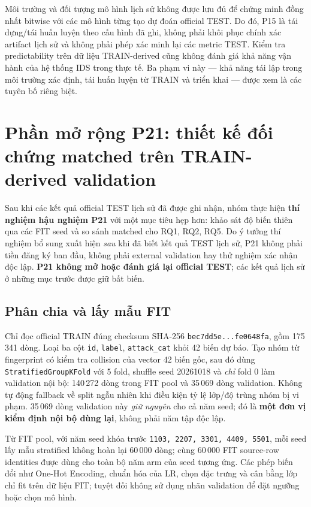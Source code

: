 Môi trường và đối tượng mô hình lịch sử không được lưu đủ để chứng minh đồng nhất bitwise với các mô hình từng tạo dự đoán official TEST. Do đó, P15 là tái dựng/tái huấn luyện theo cấu hình đã ghi, không phải khôi phục chính xác artifact lịch sử và không phải phép xác minh lại các metric TEST. Kiểm tra predictability trên dữ liệu TRAIN-derived cũng không đánh giá khả năng vận hành của hệ thống IDS trong thực tế. Ba phạm vi này — khả năng tái lập trong môi trường xác định, tái huấn luyện từ TRAIN và triển khai — được xem là các tuyên bố riêng biệt.


\section{Phần mở rộng P21: thiết kế đối chứng matched trên TRAIN-derived validation}
\label{sec:p21-method}
Sau khi các kết quả official TEST lịch sử đã được ghi nhận, nhóm thực hiện \textbf{thí nghiệm hậu nghiệm P21} với một mục tiêu hẹp hơn: khảo sát độ biến thiên qua các FIT seed và so sánh matched cho RQ1, RQ2, RQ5. Do ý tưởng thí nghiệm bổ sung xuất hiện \emph{sau} khi đã biết kết quả TEST lịch sử, P21 không phải tiền đăng ký ban đầu, không phải external validation hay thử nghiệm xác nhận độc lập. \textbf{P21 không mở hoặc đánh giá lại official TEST}; các kết quả lịch sử ở những mục trước được giữ bất biến.

\subsection{Phân chia và lấy mẫu FIT}
Chỉ đọc official TRAIN đúng checksum SHA-256 \texttt{bec7dd5e...fe0648fa}, gồm 175\,341 dòng. Loại ba cột \texttt{id}, \texttt{label}, \texttt{attack\_cat} khỏi 42 biến dự báo. Tạo nhóm từ fingerprint có kiểm tra collision của vector 42 biến gốc, sau đó dùng \texttt{StratifiedGroupKFold} với 5 fold, shuffle seed 20261018 và \emph{chỉ} fold 0 làm validation nội bộ: 140\,272 dòng trong FIT pool và 35\,069 dòng validation. Không tự động fallback về split ngẫu nhiên khi điều kiện tỷ lệ lớp/độ trùng nhóm bị vi phạm. 35\,069 dòng validation này \emph{giữ nguyên} cho cả năm seed; đó là \textbf{một đơn vị kiểm định nội bộ dùng lại}, không phải năm tập độc lập.

Từ FIT pool, với năm seed khóa trước \texttt{1103, 2207, 3301, 4409, 5501}, mỗi seed lấy mẫu stratified không hoàn lại 60\,000 dòng; cùng 60\,000 FIT source-row identities được dùng cho toàn bộ năm arm của seed tương ứng. Các phép biến đổi như One-Hot Encoding, chuẩn hóa của LR, chọn đặc trưng và cân bằng lớp chỉ fit trên dữ liệu FIT; tuyệt đối không sử dụng nhãn validation để đặt ngưỡng hoặc chọn mô hình.

